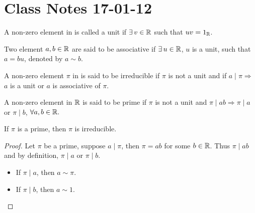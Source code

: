 \section{Class Notes 17-01-12}\label{PIDUFD}
\begin{definition}
A non-zero element in \R{} is called a unit if $\exists\, v\in \mathbb{R}$ such that $uv=1_{\mathbb{R}}$.
\end{definition}
\begin{definition}
Two element $a,b \in\mathbb{R}$ are said to be associative if $\exists\, u\in\mathbb{R}$, $u$ is a unit, such that $a=bu$, denoted by $a\sim b$.
\end{definition}
\begin{definition}
A non-zero element $\pi$ in \R{} is said to be irreducible if $\pi$ is not a unit and if $a\mid \pi\Rightarrow$ $a$ is a unit or $a$ is associative of $\pi$.
\end{definition}
\begin{definition}
A non-zero element in $\mathbb{R}$ is said to be prime if $\pi$ is not a unit and $\pi\mid  ab\Rightarrow \pi\mid a$ or $\pi\mid b$, $\forall a,b\in\mathbb{R}.$
\end{definition}
\begin{proposition}
If $\pi$ is a prime, then $\pi$ is irreducible.
\end{proposition}
\begin{proof}
Let $\pi$ be a prime, suppose $a\mid \pi$, then $\pi=ab$ for some $b\in\mathbb{R}$. Thus $\pi\mid ab$ and by definition, $\pi\mid a$ or $\pi\mid b$.
\begin{itemize}
\item If $\pi\mid a$, then $a\sim \pi$.
\item If $\pi\mid b$, then $a\sim 1$.
\end{itemize}
\end{proof}
